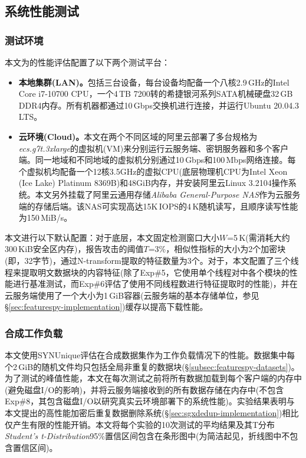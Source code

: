 \subsection{系统性能测试}
\label{subsec:featurespy-evaluation-performance}

\subsubsection{测试环境}
\label{subsubsec:featurespy-platform}

本文为\prototype 的性能评估配置了以下两个测试平台：

\begin{itemize}[leftmargin=0em]
    \item {\bf 本地集群(LAN)。}包括三台设备，每台设备均配备一个八核2.9\,GHz的Intel Core i7-10700 CPU，一个4\,TB 7200转的希捷银河系列SATA机械硬盘32\,GB DDR4内存。所有机器都通过10\,Gbps交换机进行连接，并运行Ubuntu 20.04.3 LTS。
    \item {\bf 云环境(Cloud)。}本文在两个不同区域的阿里云\cite{Alibaba}部署了多台规格为\textit{ecs.g7t.3xlarge}的虚拟机(VM)来分别运行云服务端、密钥服务器和多个客户端。同一地域和不同地域的虚拟机分别通过10\,Gbps和100\,Mbps网络连接。每个虚拟机均配备一个12核3.5GHz的虚拟CPU(底层物理机CPU为Intel Xeon (Ice Lake) Platinum 8369B)和48GiB内存，并安装阿里云Linux 3.2104操作系统。本文另外挂载了阿里云通用存储\textit{Alibaba General-Purpose NAS}作为云服务端的存储后端。该NAS可实现高达15K\,IOPS的4\,K随机读写，且顺序读写性能为150\,MiB/s。
\end{itemize}

本文进行以下默认配置：对于底层\sysnameF，本文固定检测窗口大小$W$=5\,K(需消耗大约300\,KiB安全区内存)，报告攻击的阈值$T$=3\%，相似性指标的大小为2个加密块(即，32字节)，通过N-transform提取的特征数量为3个。对于\prototype，本文配置了三个线程来提取明文数据块的内容特征(除了Exp\#5，它使用单个线程对\prototype 中各个模块的性能进行基准测试，而Exp\#6评估了\prototype 使用不同线程数进行特征提取时的性能)，并在云服务端使用了一个大小为1\,GiB容器(云服务端的基本存储单位，参见\S\ref{sec:featurespy-implementation})缓存以提高下载性能。

\subsubsection{合成工作负载}
\label{subsubsec:featurespy-syn}
本文使用SYNUnique评估\prototype 在合成数据集作为工作负载情况下的性能。数据集中每个2\,GiB的随机文件均只包括全局非重复的数据块(\S\ref{subsec:featurespy-datasets})。为了测试\prototype 的峰值性能，本文在每次测试之前将所有数据加载到每个客户端的内存中(避免磁盘I/O的影响)，并将云服务端接收到的所有数据存储在内存中(不包含Exp\#8，其包含磁盘I/O以研究真实云环境部署下的系统性能)。实验结果表明\prototype 与本文提出的高性能加密后重复数据删除系统\sysnameS (\S\ref{sec:sgxdedup-implementation})相比仅产生有限的性能开销。本文将每个实验的10次测试的平均结果及其T分布\textit{Student's t-Distribution}95\%置信区间包含在条形图中(为简洁起见，折线图中不包含置信区间)。

